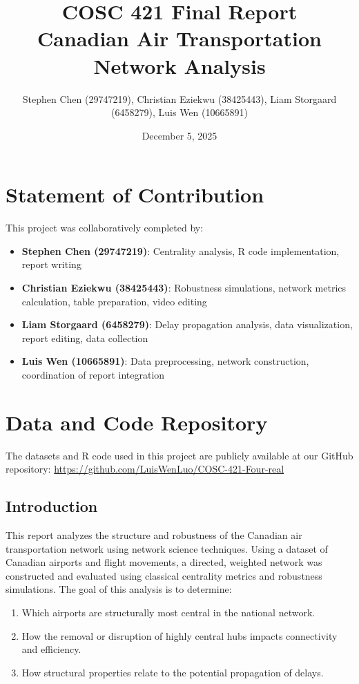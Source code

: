 \documentclass[9pt]{article}
\title{COSC 421 Final Report\\Canadian Air Transportation Network Analysis}
\author{Stephen Chen (29747219), Christian Eziekwu (38425443), Liam Storgaard (6458279), Luis Wen (10665891)}
\date{December 5, 2025}
\begin{document}
\maketitle

\section*{Statement of Contribution}

This project was collaboratively completed by:

\begin{itemize}
    \item \textbf{Stephen Chen (29747219)}: Centrality analysis, R code implementation, report writing
    \item \textbf{Christian Eziekwu (38425443)}: Robustness simulations, network metrics calculation, table preparation, video editing
    \item \textbf{Liam Storgaard (6458279)}: Delay propagation analysis, data visualization, report editing, data collection
    \item \textbf{Luis Wen (10665891)}: Data preprocessing, network construction, coordination of report integration
\end{itemize}


\section*{Data and Code Repository}

The datasets and R code used in this project are publicly available at our GitHub repository: 
\url{https://github.com/LuisWenLuo/COSC-421-Four-real}


\maketitle

\subsection{Introduction}

This report analyzes the structure and robustness of the Canadian air transportation network using network science techniques. Using a dataset of Canadian airports and flight movements, a directed, weighted network was constructed and evaluated using classical centrality metrics and robustness simulations. The goal of this analysis is to determine:

\begin{enumerate}[label=\arabic*.]
    \item Which airports are structurally most central in the national network.
    \item How the removal or disruption of highly central hubs impacts connectivity and efficiency.
    \item How structural properties relate to the potential propagation of delays.
\end{enumerate}
\end{document}
